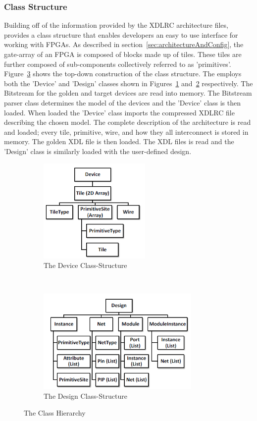 \subsubsection{Class Structure} \label{sec:classStructure}
Building off of the information provided by the XDLRC architecture files, \RapidSmith provides a class structure that enables developers an easy to use interface for working with \acrshort{FPGA}s.
As described in section~\ref{sec:architectureAndConfig}, the gate-array of an \acrshort{FPGA} is composed of blocks made up of tiles.
These tiles are further composed of sub-components collectively referred to as 'primitives'.
Figure~\ref{fig:classStructures} shows the top-down construction of the \RapidSmith class structure.
The \NameNoPeriod employs both the 'Device' and 'Design' classes shown in Figures~\ref{fig:rapidSmithDevice} and~\ref{fig:rapidSmithDesign} respectively.
The \gls{Bitstream} for the \gls{golden} and \gls{target} devices are read into memory. 
The \gls{Bitstream} parser class determines the model of the devices and the 'Device' class is then loaded.
When loaded the 'Device' class imports the compressed XDLRC file describing the chosen model.
The complete description of the architecture is read and loaded; every tile, primitive, wire, and how they all interconnect is stored in memory.
The \gls{golden} \acrshort{XDL} file is then loaded.
The \acrshort{XDL} files is read and the 'Design' class is similarly loaded with the user-defined design.
\begin{figure}[h]
	\centering
	\begin{subfigure}[t]{0.5\textwidth}
			\centering
			\includegraphics[height=2in]{Figures/rapidSmithDevice}
			\caption{The Device Class-Structure}
			\label{fig:rapidSmithDevice}
	\end{subfigure}%
	~ 
	\begin{subfigure}[t]{0.5\textwidth}
		\centering
		\includegraphics[height=2in]{Figures/rapidSmithDesign}
		\caption{The Design Class-Structure}
		 \label{fig:rapidSmithDesign}
	\end{subfigure}
	\caption{The \RapidSmith Class Hierarchy~\cite{rapidSmithManual}}
	 \label{fig:classStructures}
\end{figure}
